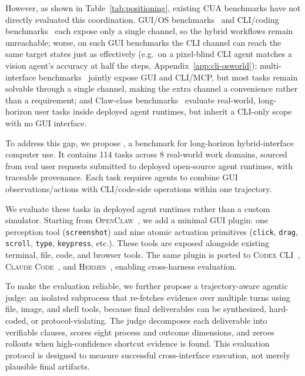 However, as shown in Table~\ref{tab:positioning}, existing CUA benchmarks have not directly evaluated this coordination. GUI/OS benchmarks~\citep{xie2024osworld,bonatti2024waa,rawles2025androidworld,koh2024visualwebarena,zhou2024webarena} and CLI/coding benchmarks~\citep{terminalbench2025,chu2026terminalworld,cheng2026terminalworldsynth} each expose only a single channel, so the hybrid workflows remain unreachable; worse, on such GUI benchmarks the CLI channel can reach the same target states just as effectively (e.g.\ on \osworld{} a pixel-blind CLI agent matches a vision agent's accuracy at half the steps, Appendix~\ref{app:cli-osworld}); multi-interface benchmarks~\citep{yan2025mcpworld,jia2025osworldmcp,aggarwal2025pwp,sun2026scienceboard,hao2026cocoabench,shi2026saasbench} jointly expose GUI and CLI/MCP, but most tasks remain solvable through a single channel, making the extra channel a convenience rather than a requirement; and Claw-class benchmarks~\citep{ding2026wildclawbench,zhang2026clawbench,chu2026terminalworld,ye2026clawEval,li2026clawenvkit,meng2026clawmark,kilocode2026pinchbench} evaluate real-world, long-horizon user tasks inside deployed agent runtimes, but inherit a CLI-only scope with no GUI interface.

To address this gap, we propose \Eyeson{}, a benchmark for long-horizon hybrid-interface computer use. It contains 114 tasks across 8 real-world work domains, sourced from real user requests submitted to deployed open-source agent runtimes, with traceable provenance. Each task requires agents to combine GUI observations/actions with CLI/code-side operations within one trajectory.

We evaluate these tasks in deployed agent runtimes rather than a custom simulator. Starting from \textsc{OpenClaw}~\citep{openclaw2025}, we add a minimal GUI plugin: one perception tool (\texttt{screenshot}) and nine atomic actuation primitives (\texttt{click}, \texttt{drag}, \texttt{scroll}, \texttt{type}, \texttt{keypress}, etc.). These tools are exposed alongside existing terminal, file, code, and browser tools. The same plugin is ported to \textsc{Codex CLI}~\citep{openai2026codexagent}, \textsc{Claude Code}~\citep{anthropic2025claudecode}, and \textsc{Hermes}~\citep{hermes2025}, enabling cross-harness evaluation.

To make the evaluation reliable, we further propose a trajectory-aware agentic judge: an isolated subprocess that re-fetches evidence over multiple turns using file, image, and shell tools, because final deliverables can be synthesized, hard-coded, or protocol-violating. The judge decomposes each deliverable into verifiable clauses, scores eight process and outcome dimensions, and zeroes rollouts when high-confidence shortcut evidence is found. This evaluation protocol is designed to measure successful cross-interface execution, not merely plausible final artifacts.


